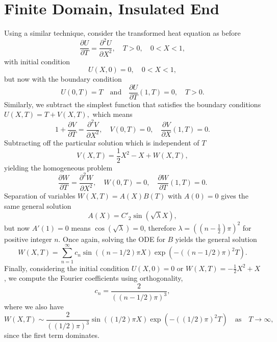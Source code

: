 \documentclass{article}
\newcommand{\pder}[2][]{\frac{\partial#1}{\partial#2}}
\newcommand{\spder}[2][]{\frac{\partial^2#1}{\partial#2^2}}
\begin{document}
\section{Finite Domain, Insulated End}

Using a similar technique, consider the transformed heat equation as before
\[ \pder[U]{T} = \spder[U]{X}, \quad T > 0, \quad 0 < X < 1,  \]
with initial condition
\[ U(X, 0) = 0, \quad 0 < X < 1, \]
but now with the boundary condition
\[ U(0, T) = T \quad \mbox{and} \quad \pder[U]{T}(1, T) = 0, \quad T > 0. \]
Similarly, we subtract the simplest function that satisfies the boundary conditions
\(U(X, T) = T + V(X, T), \)
which means
\[ 1 + \pder[V]{T} = \spder[V]{X}, \quad V(0,T) = 0, \quad \pder[V]{X}(1, T) = 0. \]
Subtracting off the particular solution which is independent of \(T\)
\[ V(X, T) = \frac{1}{2}X^2 - X + W(X, T), \]
yielding the homogeneous problem
\[ \pder[W]{T} = \spder[W]{X},\quad W(0,T) = 0, \quad \pder[W]{T}(1, T) = 0. \]
Separation of variables \(W(X, T) = A(X)B(T)\) with \(A(0) = 0\) gives the same general solution
\[ A(X) = C'_2\sin(\sqrt{\lambda}X), \]
but now \(A'(1) = 0\) means \(\cos(\sqrt{\lambda}) = 0\), therefore \(\lambda = ((n-\frac{1}{2})\pi)^2\) for positive integer \(n\). Once again, solving the ODE for \(B\) yields the general solution
\[ W(X, T) = \sum_{n=1}^\infty c_n \sin\left((n - 1/2)\pi X\right)\exp\left(-\left((n - 1/2)\pi\right)^2T\right). \]
Finally, considering the initial condition \(U(X, 0) = 0\) or \(W(X, T) = -\frac{1}{2}X^2 +X\), we compute the Fourier coefficients using orthogonality,
\[ c_n = \frac{2}{((n-1/2)\pi)^3}, \]
where we also have
\[ W(X, T) \sim \frac{2}{((1/2)\pi)^3} \sin((1/2)\pi X) \exp(-((1/2)\pi)^2 T) \quad \mbox{as} \quad T \to \infty, \]
since the first term dominates.
\end{document}
